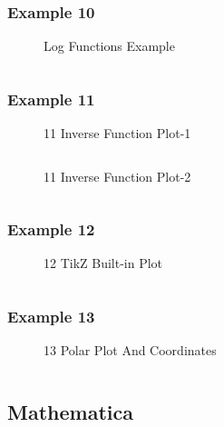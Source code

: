 \subsubsection{Example 10}
\begin{figure}[!htb]
    \centering
    
    \caption{Log Functions Example}
    \label{fig:10-log-function}
\end{figure}
\inputminted{latex}{./gallery/example_10.tex}
\newpage


\subsubsection{Example 11}
\begin{figure}[!htb]
    \centering
    
    \caption{11 Inverse Function Plot-1}
    \label{fig:11-inverse-function-1}
\end{figure}
\inputminted{latex}{./gallery/example_11_1.tex}

\begin{figure}[!htb]
    \centering
    
    \caption{11 Inverse Function Plot-2}
    \label{fig:11-inverse-function-2}
\end{figure}
\inputminted{latex}{./gallery/example_11_2.tex}
\newpage

\subsubsection{Example 12}
\begin{figure}[!htb]
    \centering
    
    \caption{12 TikZ Built-in Plot}
    \label{fig:12-tikz-plot}
\end{figure}
\inputminted{latex}{./gallery/example_12.tex}
\newpage

\subsubsection{Example 13}
\begin{figure}[!htb]
    \centering
    
    \caption{13 Polar Plot And Coordinates}
    \label{fig:13-polar-plot}
\end{figure}
\inputminted{latex}{./gallery/example_13.tex}
\newpage


\subsection{Mathematica}
